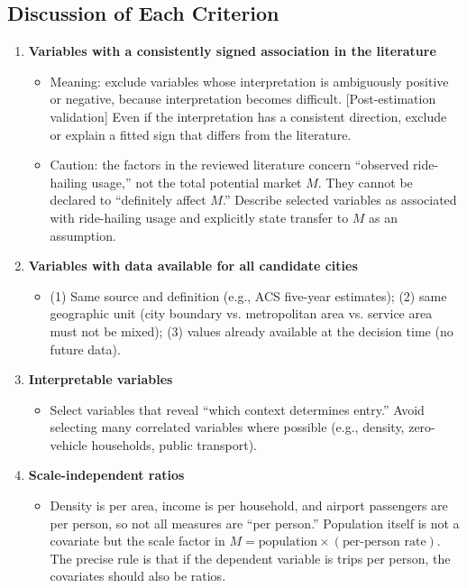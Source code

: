\documentclass[10pt,a4paper]{article}
\begin{document}
\begin{mdframed}[linecolor=red,linewidth=0.6pt,innerleftmargin=8pt,innerrightmargin=8pt]
\subsection{Discussion of Each Criterion}
\begin{enumerate}
\item \textbf{Variables with a consistently signed association in the literature}
\begin{itemize}
\item Meaning: exclude variables whose interpretation is ambiguously positive or negative, because interpretation becomes difficult. [Post-estimation validation] Even if the interpretation has a consistent direction, exclude or explain a fitted sign that differs from the literature.
\item Caution: the factors in the reviewed literature concern ``observed ride-hailing usage,'' not the total potential market $M$. They cannot be declared to ``definitely affect $M$.'' Describe selected variables as associated with ride-hailing usage and explicitly state transfer to $M$ as an assumption.
\end{itemize}
\item \textbf{Variables with data available for all candidate cities}
\begin{itemize}
\item (1) Same source and definition (e.g., ACS five-year estimates); (2) same geographic unit (city boundary vs. metropolitan area vs. service area must not be mixed); (3) values already available at the decision time (no future data).
\end{itemize}
\item \textbf{Interpretable variables}
\begin{itemize}
\item Select variables that reveal ``which context determines entry.'' Avoid selecting many correlated variables where possible (e.g., density, zero-vehicle households, public transport).
\end{itemize}
\item \textbf{Scale-independent ratios}
\begin{itemize}
\item Density is per area, income is per household, and airport passengers are per person, so not all measures are ``per person.'' Population itself is not a covariate but the scale factor in $M=\text{population}\times(\text{per-person rate})$. The precise rule is that if the dependent variable is trips per person, the covariates should also be ratios.

\end{itemize}
\end{enumerate}
\end{mdframed}
\end{document}
